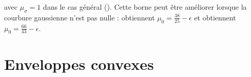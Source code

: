 %
avec $\mu_{\sigma} = 1$ dans le cas général (). Cette
borne peut être améliorer lorsque la courbure gaussienne n'est pas nulle :
 obtiennent $\mu_0=\frac{38}{25}-\epsilon$ et  obtiennent $\mu_0= \frac{66}{43}-\epsilon$.
%
%
\todoInlineJeremy{-----------------------------------------------------------------}
%
%


%
\section{Enveloppes convexes}
%



